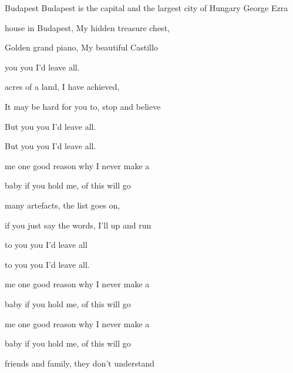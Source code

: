 \begin{SBSong}{Budapest}
  {Budapest is the capital and the largest city of Hungary}
  {George Ezra}
  \begin{SBVerse}
     house in Budapest, My hidden treasure chest,
    
    Golden grand piano, My beautiful Castillo
    
     you you I'd leave  all.
    
     acres of a land, I have achieved,
    
    It may be hard for you to, stop and believe
    
    But  you you I'd leave  all.
    
    But  you you I'd leave  all.
  \end{SBVerse}  
  \begin{SBChorus}
     me one good reason why I  never make a 
    
     baby if you hold me,  of this will go 
  \end{SBChorus}
  \begin{SBVerse}
     many artefacts, the list goes on, 

    if you just say the words, I'll up and run
    
     to you you I'd leave  all
    
     to you you I'd leave  all.
  \end{SBVerse}
  \begin{SBChorus}
     me one good reason why I   never make a 
    
     baby if you hold me,  of this will go 
    
     me one good reason why I  never make a 
    
     baby if you hold me,  of this will go 
  \end{SBChorus}
  
      
  
  \begin{SBVerse}  
      friends and family, they don't understand
     

\end{SBVerse}
\end{SBSong}
